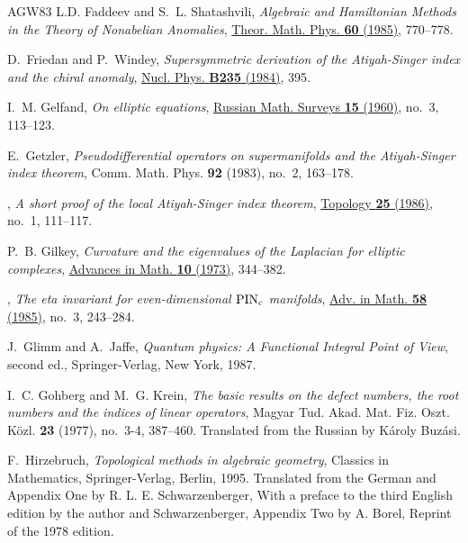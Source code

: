 \documentclass[11pt]{amsart}
\theoremstyle{definition}
\theoremstyle{remark}
\theoremstyle{plain}
\numberwithin{equation}{section}
\renewcommand{\:}{\colon}
\begin{document}
\begin{thebibliography}{AGW83}
L.D. Faddeev and S.~L. Shatashvili, \emph{{Algebraic and Hamiltonian Methods in
  the Theory of Nonabelian Anomalies}},
  \href{http://dx.doi.org/10.1007/BF01018976}{Theor. Math. Phys. \textbf{60}
  (1985)}, 770--778.

D.~Friedan and P.~Windey, \emph{Supersymmetric derivation of the
  {Atiyah-Singer} index and the chiral anomaly},
  \href{http://dx.doi.org/10.1016/0550-3213(84)90506-6}{Nucl. Phys.
  \textbf{B235} (1984)},
395.

I.~M. Gelfand, \emph{On elliptic equations},
  \href{http://dx.doi.org/10.1070/RM1960v015n03ABEH004094}{Russian Math.
  Surveys \textbf{15} (1960)}, no.~3, 113--123.

E.~Getzler, \emph{Pseudodifferential operators on supermanifolds and the
  {A}tiyah-{S}inger index theorem}, Comm. Math. Phys. \textbf{92} (1983),
  no.~2, 163--178.

\bysame, \emph{A short proof of the local {A}tiyah-{S}inger index theorem},
  \href{http://dx.doi.org/10.1016/0040-9383(86)90008-X}{Topology \textbf{25}
  (1986)}, no.~1, 111--117.

P.~B. Gilkey, \emph{Curvature and the eigenvalues of the {L}aplacian for
  elliptic complexes},
  \href{http://dx.doi.org/10.1016/0001-8708(73)90119-9}{Advances in Math.
  \textbf{10} (1973)}, 344--382.

\bysame, \emph{The eta invariant for even-dimensional {${\rm PIN}_{{\rm c}}$}
  manifolds}, \href{http://dx.doi.org/10.1016/0001-8708(85)90119-7}{Adv. in
  Math. \textbf{58} (1985)}, no.~3, 243--284.

J.~Glimm and A.~Jaffe, \emph{Quantum physics: A Functional Integral Point of
  View}, second ed., Springer-Verlag, New York, 1987.

I.~C. Gohberg and M.~G. Krein, \emph{The basic results on the defect numbers,
  the root numbers and the indices of linear operators}, Magyar Tud. Akad. Mat.
  Fiz. Oszt. K\"{o}zl. \textbf{23} (1977), no.~3-4, 387--460. Translated from
  the Russian by K\'{a}roly Buz\'{a}si.

F.~Hirzebruch, \emph{Topological methods in algebraic geometry}, Classics in
  Mathematics, Springer-Verlag, Berlin, 1995. Translated from the German and
  Appendix One by R. L. E. Schwarzenberger, With a preface to the third English
  edition by the author and Schwarzenberger, Appendix Two by A. Borel, Reprint
  of the 1978 edition.


\end{thebibliography}
\end{document}

